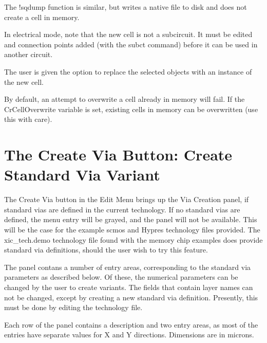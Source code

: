 The {\cb !sqdump} function is similar, but writes a native file to
disk and does not create a cell in memory.

In electrical mode, note that the new cell is not a subcircuit.  It
must be edited and connection points added (with the {\cb subct}
command) before it can be used in another circuit.

The user is given the option to replace the selected objects with
an instance of the new cell.

By default, an attempt to overwrite a cell already in memory will
fail.  If the {\et CrCellOverwrite} variable is set, existing cells in
memory can be overwritten (use this with care). 


\section{The {\cb Create Via} Button: Create Standard Via Variant}

The {\cb Create Via} button in the {\cb Edit Menu} brings up the {\cb
Via Creation} panel, if standard vias are defined in the current
technology.  If no standard vias are defined, the menu entry will be
grayed, and the panel will not be available.  This will be the case
for the example {\vt scmos} and Hypres technology files provided.  The
{\vt xic\_tech.demo} technology file found with the memory chip
examples does provide standard via definitions, should the user wish
to try this feature.

The panel contans a number of entry areas, corresponding to the
standard via parameters as described below.  Of these, the numerical
parameters can be changed by the user to create variants.  The fields
that contain layer names can not be changed, except by creating a new
standard via definition.  Presently, this must be done by editing the
technology file.

Each row of the panel contains a description and two entry areas, as
most of the entries have separate values for X and Y directions. 
Dimensions are in microns.

